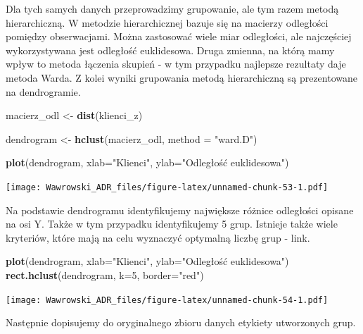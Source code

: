 \documentclass[
]{book}
\newenvironment{Shaded}{\begin{snugshade}}{\end{snugshade}}
\newcommand{\DataTypeTok}[1]{\textcolor[rgb]{0.13,0.29,0.53}{#1}}
\newcommand{\DecValTok}[1]{\textcolor[rgb]{0.00,0.00,0.81}{#1}}
\newcommand{\KeywordTok}[1]{\textcolor[rgb]{0.13,0.29,0.53}{\textbf{#1}}}
\newcommand{\NormalTok}[1]{#1}
\newcommand{\OperatorTok}[1]{\textcolor[rgb]{0.81,0.36,0.00}{\textbf{#1}}}
\newcommand{\StringTok}[1]{\textcolor[rgb]{0.31,0.60,0.02}{#1}}
\begin{document}
Dla tych samych danych przeprowadzimy grupowanie, ale tym razem metodą hierarchiczną. W metodzie hierarchicznej bazuje się na macierzy odległości pomiędzy obserwacjami. Można zastosować wiele miar odległości, ale najczęściej wykorzystywana jest odległość euklidesowa. Druga zmienna, na którą mamy wpływ to metoda łączenia skupień - w tym przypadku najlepsze rezultaty daje metoda Warda. Z kolei wyniki grupowania metodą hierarchiczną są prezentowane na dendrogramie.

\begin{Shaded}
\begin{Highlighting}[]
\NormalTok{macierz_odl <-}\StringTok{ }\KeywordTok{dist}\NormalTok{(klienci_z)}

\NormalTok{dendrogram <-}\StringTok{ }\KeywordTok{hclust}\NormalTok{(macierz_odl, }\DataTypeTok{method =} \StringTok{"ward.D"}\NormalTok{)}

\KeywordTok{plot}\NormalTok{(dendrogram, }\DataTypeTok{xlab=}\StringTok{"Klienci"}\NormalTok{, }\DataTypeTok{ylab=}\StringTok{"Odległość euklidesowa"}\NormalTok{)}
\end{Highlighting}
\end{Shaded}

\texttt{[image: Wawrowski\_ADR\_files/figure-latex/unnamed-chunk-53-1.pdf]}

Na podstawie dendrogramu identyfikujemy największe różnice odległości opisane na osi Y. Także w tym przypadku identyfikujemy 5 grup. Istnieje także wiele kryteriów, które mają na celu wyznaczyć optymalną liczbę grup - link.

\begin{Shaded}
\begin{Highlighting}[]
\KeywordTok{plot}\NormalTok{(dendrogram, }\DataTypeTok{xlab=}\StringTok{"Klienci"}\NormalTok{, }\DataTypeTok{ylab=}\StringTok{"Odległość euklidesowa"}\NormalTok{)}
\KeywordTok{rect.hclust}\NormalTok{(dendrogram, }\DataTypeTok{k=}\DecValTok{5}\NormalTok{, }\DataTypeTok{border=}\StringTok{"red"}\NormalTok{)}
\end{Highlighting}
\end{Shaded}

\texttt{[image: Wawrowski\_ADR\_files/figure-latex/unnamed-chunk-54-1.pdf]}

Następnie dopisujemy do oryginalnego zbioru danych etykiety utworzonych grup.

\begin{Shaded}
\end{Shaded}
\end{document}
